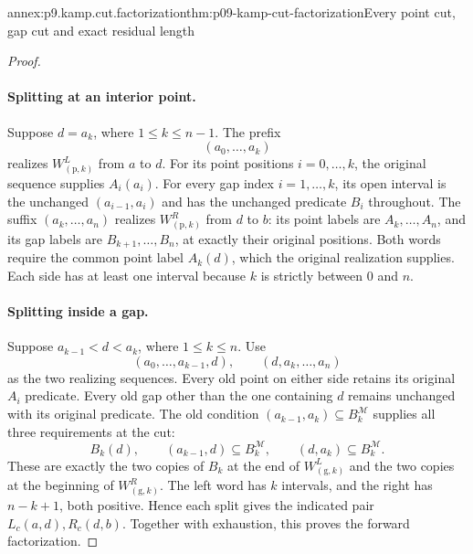 \begin{annexitem}{annex:p9.kamp.cut.factorization}{thm:p09-kamp-cut-factorization}{Every point cut, gap cut and exact residual length}
\begin{proof}
\paragraph{Splitting at an interior point.}
Suppose \(d=a_k\), where \(1\leq k\leq n-1\). The prefix
\[
                         (a_0,\ldots,a_k)
\]
realizes \(W_{(\mathrm p,k)}^L\) from \(a\) to \(d\).
For its point positions \(i=0,\ldots,k\), the original sequence
supplies \(A_i(a_i)\). For every gap index \(i=1,\ldots,k\),
its open interval is the unchanged \((a_{i-1},a_i)\) and has
the unchanged predicate \(B_i\) throughout.
The suffix \((a_k,\ldots,a_n)\) realizes
\(W_{(\mathrm p,k)}^R\) from \(d\) to \(b\): its point
labels are \(A_k,\ldots,A_n\), and its gap labels are
\(B_{k+1},\ldots,B_n\), at exactly their original positions.
Both words require the common point label \(A_k(d)\), which the
original realization supplies. Each side has at least one interval
because \(k\) is strictly between 0 and \(n\).

\paragraph{Splitting inside a gap.}
Suppose \(a_{k-1}<d<a_k\), where \(1\leq k\leq n\).
Use
\[
             (a_0,\ldots,a_{k-1},d),\qquad
             (d,a_k,\ldots,a_n)
\]
as the two realizing sequences. Every old point on either side retains
its original \(A_i\) predicate. Every old gap other than the
one containing \(d\) remains unchanged with its original predicate.
The old condition
\((a_{k-1},a_k)\subseteq B_k^{\mathcal M}\) supplies all
three requirements at the cut:
\[
 B_k(d),\qquad
 (a_{k-1},d)\subseteq B_k^{\mathcal M},\qquad
 (d,a_k)\subseteq B_k^{\mathcal M}.
\]
These are exactly the two copies of \(B_k\) at the end of
\(W_{(\mathrm g,k)}^L\) and the two copies at the beginning
of \(W_{(\mathrm g,k)}^R\). The left word has \(k\)
intervals, and the right has \(n-k+1\), both positive. Hence
each split gives the indicated pair \(L_c(a,d),R_c(d,b)\).
Together with exhaustion, this proves the forward factorization.


\end{proof}
\end{annexitem}
